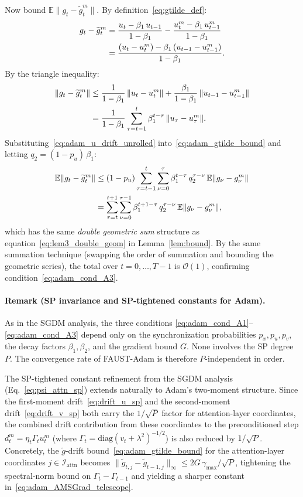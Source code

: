 \documentclass{article}
\begin{document}
Now bound $\mathbb{E}\|g_t - \widetilde{g}_t^m\|$.
By definition~\eqref{eq:gtilde_def}:
\begin{align}
g_t - \widetilde{g}_t^m
&= \frac{u_t - \beta_1\,u_{t-1}}{1-\beta_1}
   - \frac{u_t^m - \beta_1\,u_{t-1}^m}{1-\beta_1} \notag \\
&= \frac{(u_t - u_t^m) - \beta_1\,(u_{t-1} - u_{t-1}^m)}{1-\beta_1}.
\label{eq:adam_gtilde_diff}
\end{align}
By the triangle inequality:
\begin{align}
\|g_t - \widetilde{g}_t^m\|
&\leq \frac{1}{1-\beta_1}\,\|u_t - u_t^m\|
  + \frac{\beta_1}{1-\beta_1}\,\|u_{t-1} - u_{t-1}^m\| \notag \\
&= \frac{1}{1-\beta_1}\sum_{\tau=t-1}^{t}
\beta_1^{t-\tau}\,\|u_\tau - u_\tau^m\|.
\label{eq:adam_gtilde_bound}
\end{align}
Substituting~\eqref{eq:adam_u_drift_unrolled}
into~\eqref{eq:adam_gtilde_bound} and letting
$q_2 = (1-p_u)\,\beta_1$:
\begin{align}
\mathbb{E}\|g_t - \widetilde{g}_t^m\|
&\leq (1-p_u)\sum_{\tau=t-1}^{t}\sum_{\nu=0}^{\tau}
\beta_1^{t-\tau}\,q_2^{\tau-\nu}\,\mathbb{E}\|g_\nu - g_\nu^m\|
\notag \\
&= \sum_{\tau=t}^{t+1}\sum_{\nu=0}^{\tau-1}
\beta_1^{t+1-\tau}\,q_2^{\tau-\nu}\,\mathbb{E}\|g_\nu - g_\nu^m\|,
\label{eq:adam_gtilde_double_geom}
\end{align}
which has the same \emph{double geometric sum} structure as
equation~\eqref{eq:lem3_double_geom} in Lemma~\ref{lem:bound}. By the same
summation technique (swapping the order of summation and bounding the
geometric series), the total over $t = 0, \ldots, T-1$ is $\mathcal{O}(1)$,
confirming condition~\eqref{eq:adam_cond_A3}.

\paragraph{Remark (SP invariance and SP-tightened constants for Adam).}
As in the SGDM analysis, the three conditions
\eqref{eq:adam_cond_A1}--\eqref{eq:adam_cond_A3} depend only on the
synchronization probabilities $p_x, p_u, p_v$, the decay factors
$\beta_1, \beta_2$, and the gradient bound $G$. None involves the SP
degree $P$. The convergence rate of FAUST-Adam is therefore
$P$-independent in order.

The SP-tightened constant refinement from the SGDM analysis
(Eq.~\eqref{eq:psi_attn_sp}) extends naturally to Adam's two-moment
structure. Since the first-moment drift~\eqref{eq:drift_u_sp} and the
second-moment drift~\eqref{eq:drift_v_sp} both carry the $1/\sqrt{P}$
factor for attention-layer coordinates, the combined drift contribution
from these coordinates to the preconditioned step
$d_t^m = \eta_t \Gamma_t u_t^m$ (where $\Gamma_t = \mathrm{diag}(v_t + \lambda^2)^{-1/2}$)
is also reduced by $1/\sqrt{P}$.
Concretely, the $\tilde{g}$-drift bound~\eqref{eq:adam_gtilde_bound} for the
attention-layer coordinates $j \in \mathcal{I}_{\text{attn}}$ becomes
$\|\tilde{g}_{t,j} - \tilde{g}_{t-1,j}\|_\infty \leq 2G\,\gamma_{\max}/\sqrt{P}$,
tightening the spectral-norm bound on $\Gamma_t - \Gamma_{t-1}$ and
yielding a sharper constant in~\eqref{eq:adam_AMSGrad_telescope}.
\end{document}
